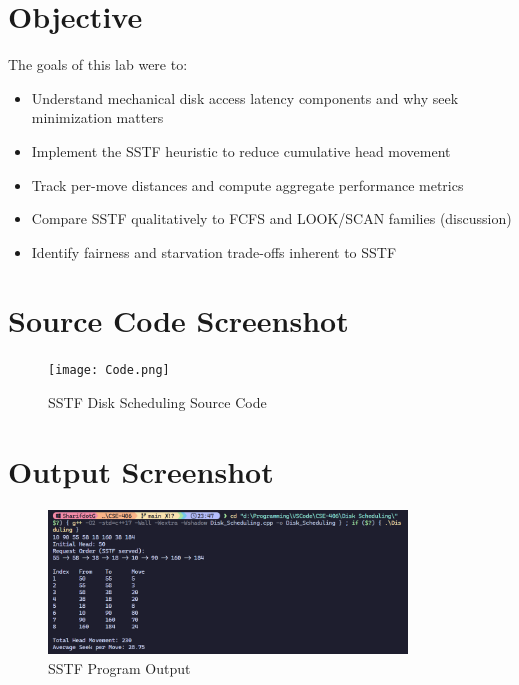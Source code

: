 \documentclass[12pt,a4paper]{article}
\begin{document}
\section{Objective}
The goals of this lab were to:
\begin{itemize}
    \item Understand mechanical disk access latency components and why seek minimization matters
    \item Implement the SSTF heuristic to reduce cumulative head movement
    \item Track per-move distances and compute aggregate performance metrics
    \item Compare SSTF qualitatively to FCFS and LOOK/SCAN families (discussion)
    \item Identify fairness and starvation trade-offs inherent to SSTF
\end{itemize}

\section{Source Code Screenshot}
\begin{figure}[H]
  \centering
  \texttt{[image: Code.png]}
  \caption{SSTF Disk Scheduling Source Code}
\end{figure}

\section{Output Screenshot}
\begin{figure}[H]
  \centering
  \includegraphics[width=0.85\textwidth]{Screenshot 2025-08-16 234738.png}
  \caption{SSTF Program Output}
\end{figure}
\end{document}

